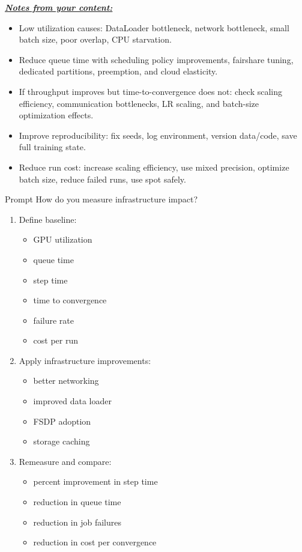 \documentclass[12pt]{article}
\newcommand{\keysent}[1]{\textbf{\textit{\uline{#1}}}}
\let\origtextbf\textbf
\renewcommand{\textbf}[1]{\origtextbf{\textit{#1}}}
\begin{document}
\keysent{Notes from your content:}
\begin{itemize}
\item Low utilization causes: DataLoader bottleneck, network bottleneck, small batch size, poor overlap, CPU starvation.
\item Reduce queue time with scheduling policy improvements, fairshare tuning, dedicated partitions, preemption, and cloud elasticity.
\item If throughput improves but time-to-convergence does not: check scaling efficiency, communication bottlenecks, LR scaling, and batch-size optimization effects.
\item Improve reproducibility: fix seeds, log environment, version data/code, save full training state.
\item Reduce run cost: increase scaling efficiency, use mixed precision, optimize batch size, reduce failed runs, use spot safely.
\end{itemize}

\begin{greenbox}{Prompt}
How do you measure infrastructure impact?
\begin{enumerate}[leftmargin=1.3em]
\item Define baseline:
\begin{itemize}
\item GPU utilization
\item queue time
\item step time
\item time to convergence
\item failure rate
\item cost per run
\end{itemize}
\item Apply infrastructure improvements:
\begin{itemize}
\item better networking
\item improved data loader
\item FSDP adoption
\item storage caching
\end{itemize}
\item Remeasure and compare:
\begin{itemize}
\item percent improvement in step time
\item reduction in queue time
\item reduction in job failures
\item reduction in cost per convergence
\end{itemize}
\end{enumerate}
\end{greenbox}
\end{document}
